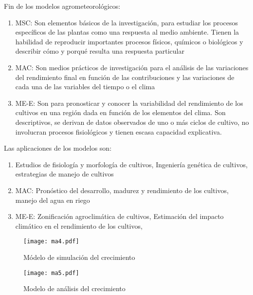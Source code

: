 Fin de los modelos agrometeorológicos:
\begin{enumerate}
  \item MSC: Son elementos básicos de la investigación, para estudiar los procesos específicos de las plantas como una respuesta al medio ambiente. Tienen la habilidad de reproducir importantes procesos físicos, químicos o biológicos y describir cómo y porqué resulta una respuesta particular
  \item MAC: Son medios prácticos de investigación para el análisis de las variaciones del rendimiento final en función de las contribuciones y las variaciones de cada una de las variables del tiempo o el clima
  \item ME-E: Son para pronosticar y conocer la variabilidad del rendimiento de los cultivos en una región dada en función de los elementos del clima. Son descriptivos, se derivan de datos observados de uno o más ciclos de cultivo, no involucran procesos fisiológicos y tienen escasa capacidad explicativa.
\end{enumerate}
Las aplicaciones de los modelos son:
\begin{enumerate}
  \item Estudios de fisiología y morfología de cultivos, Ingeniería genética de cultivos, estrategias de manejo de cultivos
  \item MAC: Pronóstico del desarrollo, madurez y rendimiento de los cultivos, manejo del agua en riego
  \item ME-E: Zonificación agroclimática de cultivos, Estimación del impacto climático en el rendimiento de los cultivos,
\end{enumerate}
\begin{figure}[h!]
\centering
  \texttt{[image: ma4.pdf]}
  \caption{Módelo de simulación del crecimiento}
  \label{ma4}
\end{figure}
\begin{figure}[h!]
\centering
  \texttt{[image: ma5.pdf]}
  \caption{Modelo de análisis del crecimiento}
  \label{ma5}
\end{figure}
